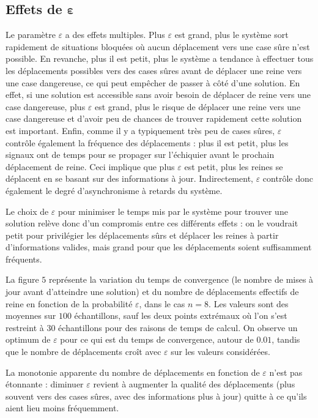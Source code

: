 \documentclass[11pt, openany]{article}
\begin{document}
\subsection*{Effets de $\boldsymbol \varepsilon$}



Le paramètre $\varepsilon$ a des effets multiples. Plus $\varepsilon$ est grand, plus le système sort rapidement de situations bloquées où aucun déplacement vers une case sûre n'est possible. En revanche, plus il est petit, plus le système a tendance à effectuer tous les déplacements possibles vers des cases sûres avant de déplacer une reine vers une case dangereuse, ce qui peut empêcher de passer à côté d'une solution. En effet, si une solution est accessible sans avoir besoin de déplacer de reine vers une case dangereuse, plus $\varepsilon$ est grand, plus le risque de déplacer une reine vers une case dangereuse et d'avoir peu de chances de trouver rapidement cette solution est important. Enfin, comme il y a typiquement très peu de cases sûres, $\varepsilon$ contrôle également la fréquence des déplacements : plus il est petit, plus les signaux ont de temps pour se propager sur l'échiquier avant le prochain déplacement de reine. Ceci implique que plus $\varepsilon$ est petit, plus les reines se déplacent en se basant sur des informations à jour. Indirectement, $\varepsilon$ contrôle donc également le degré d'asynchronisme à retards du système. 

Le choix de $\varepsilon$ pour minimiser le temps mis par le système pour trouver une solution relève donc d'un compromis entre ces différents effets : on le voudrait petit pour privilégier les déplacements sûrs et déplacer les reines à partir d'informations valides, mais grand pour que les déplacements soient suffisamment fréquents.

La figure $5$ représente la variation du temps de convergence (le nombre de mises à jour avant d'atteindre une solution) et du nombre de déplacements effectifs de reine en fonction de la probabilité $\varepsilon$, dans le cas $n=8$. Les valeurs sont des moyennes sur $100$ échantillons, sauf les deux points extrémaux où l'on s'est restreint à $30$ échantillons pour des raisons de temps de calcul. On observe un optimum de $\varepsilon$ pour ce qui est du temps de convergence, autour de $0.01$, tandis que le nombre de déplacements croît avec $\varepsilon$ sur les valeurs considérées. 

La monotonie apparente du nombre de déplacements en fonction de $\varepsilon$ n'est pas étonnante : diminuer $\varepsilon$ revient à augmenter la qualité des déplace\-ments (plus souvent vers des cases sûres, avec des informations plus à jour) quitte à ce qu'ils aient lieu moins fréquemment.
\end{document}

